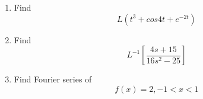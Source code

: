 \documentclass[17pt]{extarticle}
\begin{document}
\begin{enumerate}
    \item Find $$ L(t^3 + cos 4t + e^{-2t} ) $$
    \item Find $$ L^{-1} \left[ \frac{4s+15}{16s^2-25} \right] $$
    \item Find Fourier series of $$ f(x) = 2, -1<x<1 $$
\end{enumerate}
\end{document}
